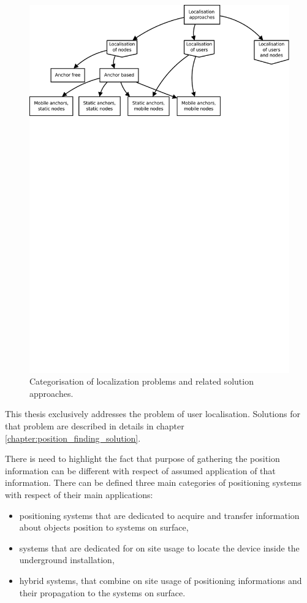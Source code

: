 \documentclass[../main.tex]{subfiles}
\begin{document}
\begin{figure}[ht]
\includegraphics[width=\textwidth, trim={0 20cm 0 0},clip]{pictures/localisation_approaches.pdf}
\centering
\caption{Categorisation of localization problems and related solution approaches\cite{discover_beacons_and_position}.}
\label{fig:localisation_approaches}
\end{figure}

This thesis exclusively addresses the problem of user localisation. Solutions for that problem are described in details in chapter \ref{chapter:position_finding_solution}.


There is need to highlight the fact that purpose of gathering the position information can be different with respect of assumed application of that information. There can be defined three main categories of positioning systems with respect of their main applications:
\begin{itemize}
	\item positioning systems that are dedicated to acquire and transfer information about objects position to systems on surface,
	\item systems that are dedicated for on site usage to locate the device inside the underground installation,
	\item hybrid systems, that combine on site usage of positioning informations and their propagation to the systems on surface.
\end{itemize}
\end{document}
